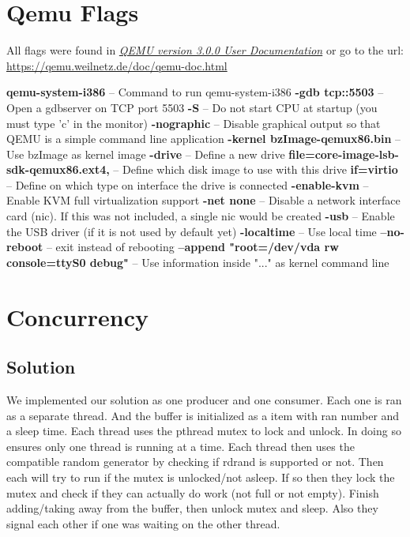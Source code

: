 \documentclass[onecolumn, draftclsnofoot,10pt, compsoc]{article}
\begin{document}
    
\section{Qemu Flags}
    All flags were found in \href{https://qemu.weilnetz.de/doc/qemu-doc.html}{\textit{QEMU version 3.0.0 User Documentation}} or go to the url: \url{https://qemu.weilnetz.de/doc/qemu-doc.html} \newline
    
    \noindent \textbf{qemu-system-i386} -- Command to run qemu-system-i386\newline
    \textbf{-gdb tcp::5503} -- Open a gdbserver on TCP port 5503\newline
    \textbf{ -S} -- Do not start CPU at startup (you must type 'c' in the monitor)\newline
    \textbf{ -nographic} -- Disable graphical output so that QEMU is a simple command line application\newline
    \textbf{-kernel bzImage-qemux86.bin} -- Use bzImage as kernel image\newline
    \textbf{-drive} -- Define a new drive\newline
    \textbf{ file=core-image-lsb-sdk-qemux86.ext4,} -- Define which disk image to use with this drive\newline
    \textbf{ if=virtio} -- Define on which type on interface the drive is connected\newline
    \textbf{ -enable-kvm} -- Enable KVM full virtualization support\newline
    \textbf{-net none} -- Disable a network interface card (nic). If this was not included, a single nic would be created\newline
    \textbf{-usb} -- Enable the USB driver (if it is not used by default yet) \newline
    \textbf{ -localtime} -- Use local time\newline
    \textbf{--no-reboot} -- exit instead of rebooting\newline
    \textbf{--append "root=/dev/vda rw console=ttyS0 debug"} -- Use information inside "..." as kernel command line \newline

\section{Concurrency}
    \subsection{Solution}
        We implemented our solution as one producer and one consumer. Each one is ran as a separate thread. And the buffer is initialized as a item with ran number and a sleep time.
        Each thread uses the pthread mutex to lock and unlock. In doing so ensures only one thread is running at a time. Each thread then uses the compatible random generator by checking if rdrand is supported or not. Then each will try to run if the mutex is unlocked/not asleep. If so then they lock the mutex and check if they can actually do work (not full or not empty). Finish adding/taking away from the buffer, then unlock mutex and sleep. Also they signal each other if one was waiting on the other thread.
\end{document}
